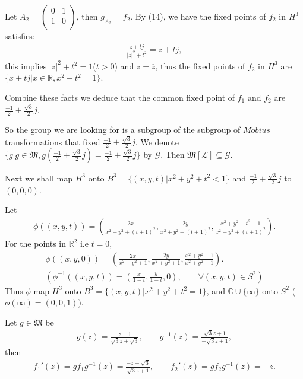 \documentclass{amsart}
\newcommand{\G}{\mathcal G}
\newcommand{\LLL}{\mathcal L} %
\newcommand{\MMM}{\mathfrak M}
\newcommand{\C}{\mathbb C} %
\newcommand{\R}{\mathbb R}  %
\begin{document}
Let $A_2 = \left(
             \begin{array}{cc}
               0 & 1 \\
               1 & 0 \\
             \end{array}
           \right)$, then $g_{A_2} = f_2$. By (14), we have the fixed points of $f_2$ in $H^3$ satisfies:
\begin{align*}
\frac{\overline{z} + tj}{|z|^2 + t^2} = z + tj,
\end{align*}
this implies $|z|^2 + t^2 = 1$($t > 0$) and $z = \overline{z}$, thus the fixed points of $f_2$ in $H^3$ are $\{ x + tj | x \in \R, x^2 + t^2 = 1 \}$.

Combine these facts we deduce that the common fixed point of $f_1$ and $f_2$ are $\frac{-1}{2} + \frac{\sqrt{3}}{2}j$.

So the group we are looking for is a subgroup of the subgroup of $M\ddot{o}bius$ transformations that fixed $\frac{-1}{2} + \frac{\sqrt{3}}{2}j$.
We denote $\{g | g \in \MMM, g(\frac{-1}{2} + \frac{\sqrt{3}}{2}j) = \frac{-1}{2} + \frac{\sqrt{3}}{2}j \}$ by $\G$. Then $\MMM[\LLL] \subseteq \G$.

Next we shall map $H^3$ onto $B^3 = \{(x,y,t) | x^2 + y^2 + t^2 < 1 \}$ and $\frac{-1}{2} + \frac{\sqrt{3}}{2}j$ to $(0, 0, 0)$.

Let
\begin{align*}
\phi((x,y,t)) = (\frac{2x}{x^2 + y^2 + (t+1)^2}, \frac{2y}{x^2 + y^2 + (t+1)^2}, \frac{x^2 + y^2 + t^2 -1}{x^2 + y^2 + (t+1)^2}).
\end{align*}
For the points in $\R^2$ i.e $t = 0$,
\begin{align*}
\phi((x,y,0)) = (\frac{2x}{x^2 + y^2 + 1}, \frac{2y}{x^2 + y^2 + 1}, \frac{x^2 + y^2 -1}{x^2 + y^2 + 1}).\\
(\phi^{-1}((x,y,t)) = (\frac{x}{1-t}, \frac{y}{1-t}, 0), \qquad \forall  (x,y,t) \in S^2)
\end{align*}
Thus $\phi$ map $H^3$ onto $B^3 = \{(x,y,t) | x^2 + y^2 + t^2 = 1 \}$, and $\C \cup \{\infty \}$ onto $S^2$ ($\phi(\infty) = (0,0,1)$).

Let $g \in \MMM$ be
\begin{align*}
g(z) = \frac{z -1}{\sqrt{3}z + \sqrt{3}}, \qquad g^{-1}(z) = \frac{\sqrt{3}z + 1}{-\sqrt{3}z +1},
\end{align*}
then
\begin{align*}
f_{1}'(z) = gf_{1}g^{-1}(z) = \frac{-z + \sqrt{3}}{\sqrt{3}z + 1}, \qquad f_{2}'(z) = gf_{2}g^{-1}(z) = -z.
\end{align*}
\end{document}
